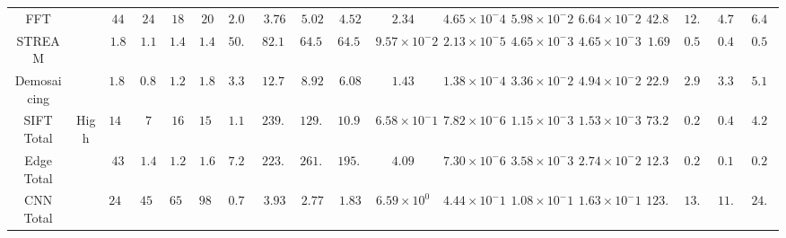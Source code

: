 \begin{landscape}
\begin{table}
{\begin{tabular}{c|c|c|c|c|c|c|c|c|c|c|c|c|c|c|c|c|c}
\cmidrule{1-1}\cmidrule{3-18}
FFT &  & $44$ & $24$ & $18$ & $20$ & $2.05$ & $3.76$ & $5.02$ & $4.52$ & $2.34$ & $4.65 \times 10^-4$ & $5.98 \times 10^-2$ & $6.64 \times 10^-2$ & $42.87$ & $12.22$ & $4.78$ & $6.42$ \\ 
\cmidrule{1-1}\cmidrule{3-18}
STREAM &  & $1.8$ & $1.1$ & $1.40$ & $1.40$ & $50.17$ & $82.10$ & $64.51$ & $64.51$ & $9.57 \times 10^-2$ & $2.13 \times 10^-5$ & $4.65 \times 10^-3$ & $4.65 \times 10^-3$ & $1.69$ & $0.50$ & $0.40$ & $0.51$ \\ 
\cmidrule{1-1}\cmidrule{3-18}
Demosaicing &  & $1.82$ & $0.87$ & $1.24$ & $1.82$ & $3.35$ & $12.71$ & $8.92$ & $6.08$ & $1.43$ & $1.38 \times 10^-4$ & $3.36 \times 10^-2$ & $4.94 \times 10^-2$ & $22.98$ & $2.99$ & $3.36$ & $5.18$ \\ 
\cmidrule{1-1}\cline{2-2}\cmidrule{3-18}
SIFT Total & \multirow{3}{*}{High} & $1429$ & $7$ & $16$ & $153$ & $1.17$ & $239.63$ & $129.02$ & $10.96$ & $6.58 \times 10^-1$ & $7.82 \times 10^-6$ & $1.15 \times 10^-3$ & $1.53 \times 10^-3$ & $73.27$ & $0.21$ & $0.48$ & $4.20$ \\ 
\cmidrule{1-1}\cmidrule{3-18}
Edge Total &  & $43$ & $1.4$ & $1.2$ & $1.6$ & $7.29$ & $223.89$ & $261.20$ & $195.90$ & $4.09$ & $7.30 \times 10^-6$ & $3.58 \times 10^-3$ & $2.74 \times 10^-2$ & $12.35$ & $0.24$ & $0.15$ & $0.20$ \\ 
\cmidrule{1-1}\cmidrule{3-18}
CNN Total &  & $2470$ & $457$ & $650$ & $980$ & $0.73$ & $3.93$ & $2.77$ & $1.83$ & $6.59 \times 10^0$ & $4.44 \times 10^-1$ & $1.08 \times 10^-1$ & $1.63 \times 10^-1$ & $123.50$ & $13.96$ & $11.17$ & $24.50$ \\
\bottomrule
\end{tabular}
}
\end{table}
\end{landscape}